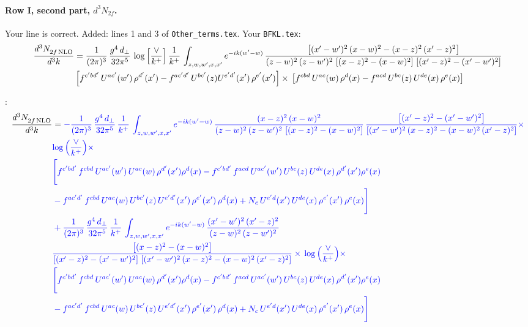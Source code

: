 \documentclass[10pt]{article}
\numberwithin{equation}{section}
\newcommand{\new}[1]{{\color{blue}#1}}
\newcommand{\nc}{\color{blue}}
\begin{document}
\paragraph{Row I, second part, $d^3N_{2f}$.}
Your line is correct. \new{Added}: lines 1 and 3 of \texttt{Other\_terms.tex}.
\noindent Your \texttt{BFKL.tex}:
\begin{align}
    \frac{d^{3}N_{2f\,\rm NLO}^{\rm}}{d^{3}k}  & =  \frac{1}{(2\pi)^{3}}\, \frac{g^{4}\,d_{\perp}}{32\pi^{5}}\,\log{\left[\frac{\vee}{k^{+}}\right]}\,\frac{1}{k^{+}}\,\int_{z,w,w^{\prime},x,x'} e^{-ik(w^{\prime}-w)}\,\frac{\left[(x'-w')^{2}\, (x-w)^{2} - (x-z)^{2}\, (x'-z)^{2}\right]}{(z-w)^{2}\, (z-w')^{2}\,\left[(x-z)^{2} - (x-w)^{2}\right]\, \left[(x'-z)^{2} - (x'-w')^{2}\right]}\notag \\ &   \left[f^{c'bd'}\, U^{ac'}(w')\,\rho^{d'}(x')-f^{ac'd'}\, U^{bc'}(z)U^{e'd'}(x')\, \rho^{e'}(x')\right]\times\, \left[f^{cbd}\, U^{ac}(w)\,\rho^{d}(x) - f^{acd}\, U^{bc}(z)\,U^{de}(x)\, \rho^{e}(x)\right] \label{eq:Byour:G2I2f}
\end{align}

\noindent \new{From \texttt{Other\_terms.tex}}:
\begin{align}
    \frac{d^{3}N_{2f\,\rm NLO}^{\rm}}{d^{3}k}  & =   \nc - \frac{1}{(2\pi)^{3}}\, \frac{g^{4}\,d_{\perp}}{32\pi^{5}}\,\frac{1}{k^{+}}\,\int_{z,w,w^{\prime},x,x'} e^{-ik(w^{\prime}-w)}\,\frac{(x-z)^{2}\, (x-w)^{2}}{(z-w)^{2}\, (z-w')^{2}\,\left[(x-z)^{2} - (x-w)^{2}\right]}\,\frac{\left[(x'-z)^{2}-(x'-w')^{2}\right]}{\left[(x'-w')^{2}\, (x-z)^{2} - (x-w)^{2}\, (x'-z)^{2}\right]}\times\notag \\ & \nc  \new{\log{\left(\frac{\vee}{k^{+}}\right)}}\times\notag \\ & \nc  \Bigg[f^{c'bd'}\,f^{cbd}\, U^{ac'}(w')\,U^{ac}(w)\,\rho^{d'}(x')\rho^{d}(x)- f^{c'bd'}\,f^{acd}\,U^{ac'}(w')\,U^{bc}(z)\,U^{de}(x)\,\rho^{d'}(x')\rho^{e}(x) \notag \\ & \nc  -f^{ac'd'}\,f^{cbd}\,U^{ac}(w)\,U^{bc'}(z)\,U^{e'd'}(x')\,\rho^{e'}(x')\,\rho^{d}(x) +N_{c}\,U^{e'd}(x')\,U^{de}(x)\,\rho^{e'}(x')\,\rho^{e}(x)\Bigg]  \notag \\
& \nc  + \frac{1}{(2\pi)^{3}}\, \frac{g^{4}\,d_{\perp}}{32\pi^{5}}\,\frac{1}{k^{+}}\,\int_{z,w,w^{\prime},x,x'} e^{-ik(w^{\prime}-w)}\,\frac{(x'-w')^{2}\, (x'-z)^{2}}{(z-w)^{2}\, (z-w')^{2}}\notag \\ & \nc  \frac{\left[(x-z)^{2} - (x-w)^{2}\right]}{\left[(x'-z)^{2} - (x'-w')^{2}\right]\, \left[(x'-w')^{2}\, (x - z)^{2} - (x-w)^{2}\,(x'-z)^{2}\right]}\times\, \new{\log{\left(\frac{\vee}{k^{+}}\right)}}\times \notag \\ & \nc   \Bigg[f^{c'bd'}\,f^{cbd}\, U^{ac'}(w')\,U^{ac}(w)\,\rho^{d'}(x')\rho^{d}(x)- f^{c'bd'}\,f^{acd}\,U^{ac'}(w')\,U^{bc}(z)\,U^{de}(x)\,\rho^{d'}(x')\rho^{e}(x) \notag \\ & \nc  -f^{ac'd'}\,f^{cbd}\,U^{ac}(w)\,U^{bc'}(z)\,U^{e'd'}(x')\,\rho^{e'}(x')\,\rho^{d}(x) +N_{c}\,U^{e'd}(x')\,U^{de}(x)\,\rho^{e'}(x')\,\rho^{e}(x)\Bigg] \label{eq:Bnew:G2I2f}
\end{align}
\end{document}
